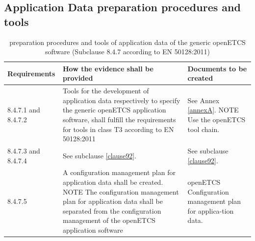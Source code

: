\documentclass{template/openetcs_report}
\begin{document}
\subsection{Application Data preparation procedures and tools}
{\footnotesize\sffamily\centering
\begin{longtable}{|p{2cm}|p{9cm}|p{3cm}|}
\caption{preparation procedures and tools of application data of the generic openETCS software (Subclause 8.4.7 according to EN 50128:2011)}\\
\hline
\bfseries Requirements & \bfseries How the evidence shall be provided & \bfseries Documents to be created\\
\hline
\hline
\endhead
\hline
\endfoot

8.4.7.1 and 8.4.7.2 & Tools for the development of application data respectively to specify the generic openETCS application software, shall fulfill the requirements for tools in class T3 according to EN 50128:2011
& See Annex \ref{annexA}.
NOTE
Use the openETCS tool chain.\\ 
\hline
8.4.7.3 and 8.4.7.4 & See subclause \ref{clause92}. & See subclause \ref{clause92}.\\ 
\hline
8.4.7.5 & A configuration management plan for application data shall be created.
\linebreak
\linebreak
NOTE\linebreak
The configuration management plan for application data shall be separated from the configuration management of the openETCS application software
& openETCS Configuration management plan for applica-tion data.\\ 
\hline
\end{longtable}}
\end{document}
